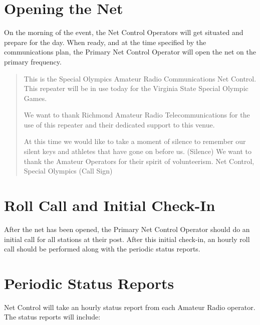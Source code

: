 \documentclass[pdflatex,letterpaper,twoside,12pt]{book}
\begin{document}

\section{Opening the Net}

On the morning of the event, the Net Control Operators will get situated and prepare for the day. When ready, and at the time specified by the communications plan, the Primary Net Control Operator will open the net on the primary frequency.

\begin{quote}
	This is the Special Olympics Amateur Radio Communications Net Control.  This repeater will be in use today for the Virginia State Special Olympic Games.

	We want to thank Richmond Amateur Radio Telecommunications for the use of this repeater and their dedicated support to this venue.

	At this time we would like to take a moment of silence to remember our silent keys and athletes that have gone on before us.  (Silence) We want to thank the Amateur Operators for their spirit of volunteerism.  Net Control, Special Olympics (Call Sign)
\end{quote}


\section{Roll Call and Initial Check-In}

After the net has been opened, the Primary Net Control Operator should do an initial call for all stations at their post. After this initial check-in, an hourly roll call should be performed along with the periodic status reports.


\section{Periodic Status Reports}

Net Control will take an hourly status report from each Amateur Radio operator. The status reports will include:
\end{document}
